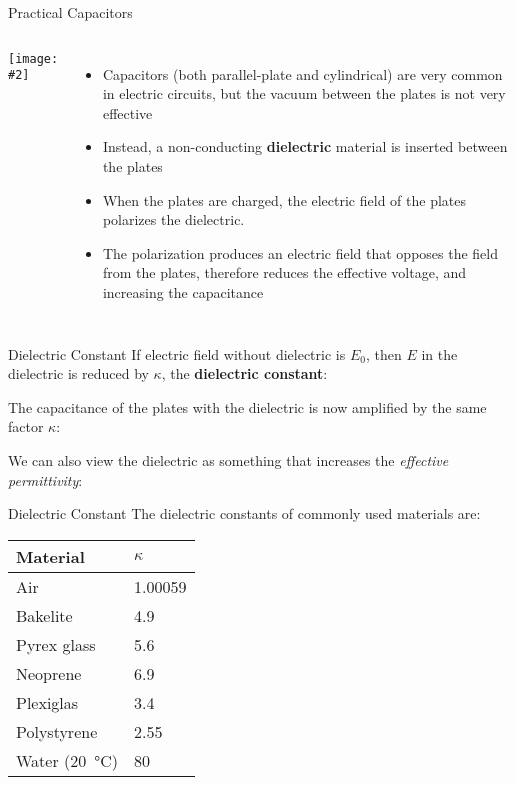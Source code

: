 \documentclass[12pt,aspectratio=169]{beamer}
\newcommand{\pic}[2]{\texttt{[image: \#2]}}
\newcommand{\eq}[2]{\vspace{#1}{\Large\begin{displaymath}#2\end{displaymath}}}
\begin{document}
\begin{frame}{Practical Capacitors}
  \begin{columns}
    \pic{1.15}{Figure_20_05_05a}

    \begin{itemize}
    \item Capacitors (both parallel-plate and cylindrical) are very common in
      electric circuits, but the vacuum between the plates is not very effective
    \item Instead, a non-conducting \textbf{dielectric} material is inserted
      between the plates
    \item When the plates are charged, the electric field of the plates
      polarizes the dielectric.
    \item The polarization  produces an electric field that opposes the field
      from the plates, therefore reduces the effective voltage, and increasing
      the capacitance
    \end{itemize}
  \end{columns}
\end{frame}



\begin{frame}{Dielectric Constant}
  If electric field without dielectric is $E_0$, then $E$ in the dielectric is
  reduced by $\kappa$, the \textbf{dielectric constant}:

  \eq{-.25in}{
    \boxed{\kappa=\frac{E_0}E}
  }

  The capacitance of the plates with the dielectric is now amplified by the
  same factor $\kappa$:

  \eq{-.3in}{
    \boxed{C=\kappa C_0}
  }

  We can also view the dielectric as something that increases the
  \emph{effective permittivity}:
  
  \eq{-.3in}{
    \boxed{\epsilon=\kappa\epsilon_0}
  }
\end{frame}



\begin{frame}{Dielectric Constant}
  The dielectric constants of commonly used materials are:
  \begin{center}
    \begin{tabular}{l|l}
      \rowcolor{pink}
      \textbf{Material} & $\kappa$ \\ \hline
      Air         & \num{1.00059} \\
      Bakelite    & \num{4.9} \\
      Pyrex glass & \num{5.6} \\
      Neoprene    & \num{6.9} \\
      Plexiglas   & \num{3.4} \\
      Polystyrene & \num{2.55} \\
      Water (\SI{20}{\celsius}) & \num{80} 
    \end{tabular}
  \end{center}
\end{frame}
\end{document}
